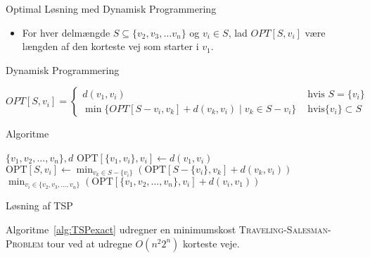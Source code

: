\begin{frame}{Optimal Løsning med Dynamisk Programmering}
    \begin{itemize}
        \item For hver delmængde $S \subseteq \{v_{2}, v_{3}, \ldots v_{n}\}$ og $v_{i} \in S$, lad $OPT[S, v_{i}]$ være længden af den korteste vej som starter i $v_{1}$.
    \end{itemize}
\end{frame}

\begin{frame}{Dynamisk Programmering}
    \begin{lemma}
        \begin{equation*}
            OPT[S, v_{i}] =
            \begin{cases}
                d(v_{1}, v_{i}) & \text{ hvis } S=\{v_{i}\} \\
                \min\{OPT[S-{v_{i}},v_{k}]+d(v_{k},v_{i}) \mid v_{k} \in S-{v_{i}}\} & \text{ hvis} \{v_{i}\} \subset S
            \end{cases}
        \end{equation*}
    \end{lemma}
\end{frame}

\begin{frame}{Algoritme}
    \begin{algorithm}
        \caption{\label{alg:TSPexact} TSP}
        \begin{algorithmic}[1]
            \REQUIRE $\{v_1, v_2, \ldots, v_n\}, d$
            \STATE $\text{OPT}[\{v_1, v_i\}, v_i] \leftarrow d(v_1, v_i)$
            \ENDFOR
            \STATE $\text{OPT}[S, v_i] \leftarrow \min_{v_k \in S - \{v_i\}} (\text{OPT}[S - \{v_i\}, v_k] + d(v_k, v_i))$
            \ENDFOR
            \ENDFOR
            \ENDFOR
            \RETURN $\min_{v_i \in \{v_2, v_3, \ldots, v_n\}} (\text{OPT}[\{v_1, v_2, \ldots, v_n\}, v_i] + d(v_i, v_1))$
        \end{algorithmic}
    \end{algorithm}
\end{frame}

\begin{frame}{Løsning af TSP}
    \begin{lemma}
        Algoritme~\ref{alg:TSPexact} udregner en minimumskost \textsc{Traveling-Salesman-Problem} tour ved at udregne $O(n^{2}2^{n})$ korteste veje.
    \end{lemma}
\end{frame}


